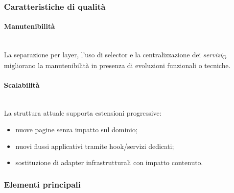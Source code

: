 \documentclass[a4paper,12pt]{article}
\begin{document}
        \subsubsection{Caratteristiche di qualità}
            \paragraph{Manutenibilità}\mbox{}\\
                La separazione per layer, l'uso di selector e la centralizzazione dei \textit{servizi}\textsubscript{\href{https://atlasteam9.github.io/Atlas/glossario.html\#Servizi}{G}} migliorano la manutenibilità in presenza di evoluzioni funzionali o tecniche.
                
            \paragraph{Scalabilità}\mbox{}\\
                La struttura attuale supporta estensioni progressive:
                \begin{itemize}
                    \item nuove pagine senza impatto sul dominio;
                    \item nuovi flussi applicativi tramite hook/servizi dedicati;
                    \item sostituzione di adapter infrastrutturali con impatto contenuto.
                \end{itemize}

        \subsubsection{Elementi principali}
\end{document}
